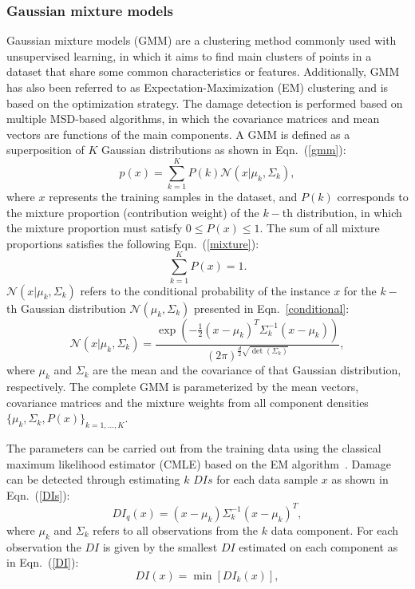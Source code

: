 \subsubsection{Gaussian mixture models}
Gaussian mixture models (GMM) are a clustering method commonly used with unsuper\-vised learning, in which it aims to find main clusters of points in a dataset that share some common characteristics or features.
Additionally, GMM has also been referred to as Expectation-Maximization (EM) clustering and is based on the optimization strategy.
The damage detection is performed based on multiple MSD-based algorithms, in which the covariance matrices and mean vectors are functions of the main components.
A GMM is defined as a superposition of \(K\) Gaussian distributions as shown in Eqn.~(\ref{gmm}):
\begin{equation}
	p(x) = \sum_{k=1}^K P(k) \mathcal{N}(x|\mu_k,\Sigma_k),
	\label{gmm}
\end{equation}
where \(x\) represents the training samples in the dataset, and \(P(k)\) corresponds to the mixture proportion (contribution weight) of the \(k-\)th distribution, in which the mixture proportion must satisfy \(0\leq P(x)\leq 1\).
The sum of all mixture proportions satisfies the following Eqn.~(\ref{mixture}):
\begin{equation}
	\sum_{k=1}^{K}P(x) =1.
	\label{mixture}
\end{equation}  
\(\mathcal{N}(x|\mu_k,\Sigma_k)\) refers to the conditional probability of the instance \(x\) for the \(k-\)th Gaussian distribution \(\mathcal{N}(\mu_k,\Sigma_k)\) presented in Eqn.~\ref{conditional}:
\begin{equation}
	\mathcal{N}(x|\mu_k,\Sigma_k) = \frac{\exp(-\frac{1}{2}(x-\mu_k)^T\Sigma_k^{-1}(x-\mu_k))}{(2\pi)^{\frac{d}{2}\sqrt{\det(\Sigma_k)}}},
	\label{conditional}		
\end{equation}
where \(\mu_k\) and \(\Sigma_k\) are the mean and the covariance of that Gaussian distribution, respectively.
The complete GMM is parameterized by the mean vectors, covariance matrices and the mixture weights from all component densities \(\{\mu_k,\Sigma_k, P(x)\}_{k=1,\hdots,K}\).

The parameters can be carried out from the training data using the classical maximum likelihood estimator (CMLE) based on the EM algorithm~\cite{Dempster1977}.
Damage can be detected through estimating \(k\) \(DIs\) for each data sample \(x\) as shown in Eqn.~(\ref{DIs}):
\begin{equation}
	DI_q(x) = (x-\mu_k)\Sigma_k^{-1}(x-\mu_k)^T,
	\label{DIs}
\end{equation}
where \(\mu_k\) and \(\Sigma_k\) refers to all observations from the \(k\) data component.
For each observation the \(DI\) is given by the smallest \(DI\) estimated on each component as in Eqn.~(\ref{DI}):
\begin{equation}
	DI(x) = \min[DI_k(x)],
	\label{DI}
\end{equation}
